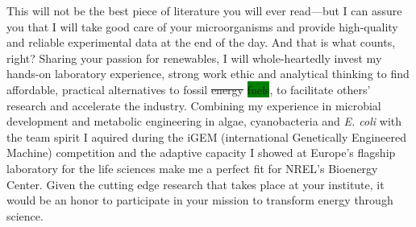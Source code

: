 \documentclass[11pt,a4paper,sans]{moderncv}
\begin{document}
\begin{spacing}{1.15}
This will not be the best piece of literature you will ever read---but I can assure you that I will take good care of your microorganisms and provide high-quality and reliable experimental data at the end of the day. %
And that is what counts, right? %
Sharing your passion for renewables, I will whole-heartedly invest my hands-on laboratory experience, strong work ethic and analytical thinking to find affordable, practical alternatives to fossil \sout{energy} \colorbox{green}{fuels}, to facilitate others' research and accelerate the industry.
Combining my experience in microbial development and metabolic engineering in algae, cyanobacteria and \textit{E. coli} with the team spirit I aquired during the iGEM (international Genetically Engineered Machine) competition and the adaptive capacity I showed at Europe's flagship laboratory for the life sciences make me a perfect fit for NREL's Bioenergy Center.
Given the cutting edge research that takes place at your institute, it would be an honor to participate in your mission to transform energy through science.%
\par\vspace*{1mm}


\end{spacing}
\end{document}
